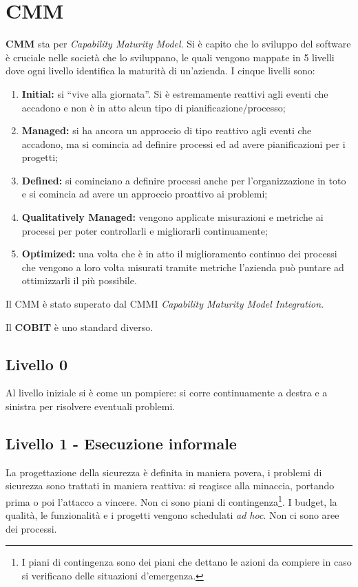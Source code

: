 \section{CMM}
\textbf{CMM} sta per \textit{Capability Maturity Model}. Si è capito che lo 
sviluppo del software è cruciale nelle società che lo sviluppano, le quali 
vengono mappate in 5 livelli dove ogni livello identifica la maturità di 
un'azienda.
I cinque livelli sono:
\begin{enumerate}
  \item \textbf{Initial:} si ``vive alla giornata''. Si è estremamente 
  reattivi agli eventi che accadono e non è in atto alcun tipo di 
  pianificazione/processo;
  \item \textbf{Managed:} si ha ancora un approccio di tipo reattivo agli 
  eventi che accadono, ma si comincia ad definire processi ed ad avere 
  pianificazioni per i progetti;
  \item \textbf{Defined:} si cominciano a definire processi anche per 
  l'organizzazione in toto e si comincia ad avere un approccio proattivo ai 
  problemi;
  \item \textbf{Qualitatively Managed:} vengono applicate misurazioni e
  metriche ai processi per poter controllarli e migliorarli continuamente;
  \item \textbf{Optimized:} una volta che è in atto il miglioramento continuo 
  dei processi che vengono a loro volta misurati tramite metriche l'azienda 
  può puntare ad ottimizzarli il più possibile.
\end{enumerate}
Il CMM è stato superato dal CMMI \textit{Capability Maturity Model Integration}.


Il \textbf{COBIT} è uno standard diverso.


\subsection{Livello 0}

Al livello iniziale si è come un pompiere: si corre continuamente a destra e a
sinistra per risolvere eventuali problemi.

\subsection{Livello 1 - Esecuzione informale}

La progettazione della sicurezza è definita in maniera povera, i problemi di 
sicurezza sono trattati in maniera reattiva: si reagisce 
alla minaccia, portando prima o poi l'attacco a vincere. Non ci sono piani di 
contingenza\footnote{I piani di contingenza sono dei piani che dettano le 
azioni da compiere in caso si verificano delle situazioni d'emergenza.}. I 
budget, la qualità, le funzionalità e i progetti vengono schedulati \textit{ad 
hoc}. Non ci sono aree dei processi.

